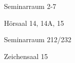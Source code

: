 \documentclass[a4paper]{article}
\begin{document}
\printHeaderLC
\begin{center}

\begin{vsltext}{1.6cm}{2cm}

    \vspace{0.5cm}
    
    Seminarraum 2-7\\
    
    \vspace{1cm}
    
    Hörsaal 14, 14A, 15\\
    
    \vspace{1cm}
    
    Seminarraum 212/232\\

    \vspace{1cm}
    
    Zeichensaal 15\\
\end{vsltext}

\end{center}
\end{document}

